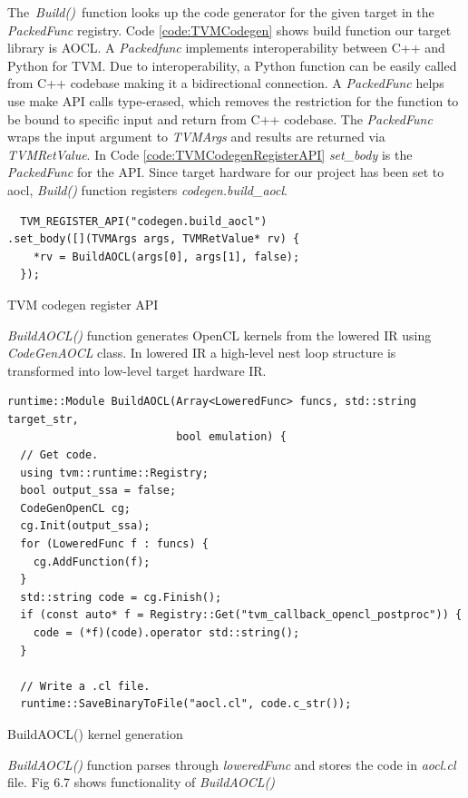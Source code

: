  The \textit{Build()} function looks up the code generator for the given target in the \textit{PackedFunc} registry. Code \ref{code:TVMCodegen} shows build function our target library is AOCL. A \textit{Packedfunc} implements interoperability between C++ and Python for TVM. Due to interoperability, a Python function can be easily called from C++ codebase making it a bidirectional connection. A \textit{PackedFunc} helps use make API calls type-erased, which removes the restriction for the function to be bound to specific input and return from C++ codebase. The \textit{PackedFunc} wraps the input argument to \textit{TVMArgs} and results are returned via \textit{TVMRetValue}. In Code \ref{code:TVMCodegenRegisterAPI} \textit{set\_body} is the \textit{PackedFunc} for the API. Since target hardware for our project has been set to aocl, \textit{Build()} function registers \textit{codegen.build\_aocl}.
 
  \begin{code}[!htb]
 \begin{verbatim}
  TVM_REGISTER_API("codegen.build_aocl")
.set_body([](TVMArgs args, TVMRetValue* rv) {
    *rv = BuildAOCL(args[0], args[1], false);
  });
\end{verbatim}
\caption{TVM codegen register API}
\label{code:TVMCodegenRegisterAPI}
\end{code}

\textit{BuildAOCL()} function generates OpenCL kernels from the lowered IR using \textit{CodeGenAOCL} class. In lowered IR a high-level nest loop structure is transformed into low-level target hardware IR.

 \begin{code}[!htb]
 \begin{verbatim}
runtime::Module BuildAOCL(Array<LoweredFunc> funcs, std::string target_str,
                          bool emulation) {
  // Get code.
  using tvm::runtime::Registry;
  bool output_ssa = false;
  CodeGenOpenCL cg;
  cg.Init(output_ssa);
  for (LoweredFunc f : funcs) {
    cg.AddFunction(f);
  }
  std::string code = cg.Finish();
  if (const auto* f = Registry::Get("tvm_callback_opencl_postproc")) {
    code = (*f)(code).operator std::string();
  }

  // Write a .cl file.
  runtime::SaveBinaryToFile("aocl.cl", code.c_str());
\end{verbatim}
\caption{BuildAOCL() kernel generation}
\label{code:TVMCodegenBildAOCL}
\end{code}

\textit{BuildAOCL()} function parses through \textit{loweredFunc} and stores the code in \textit{aocl.cl} file. Fig 6.7 shows functionality of \textit{BuildAOCL()}

